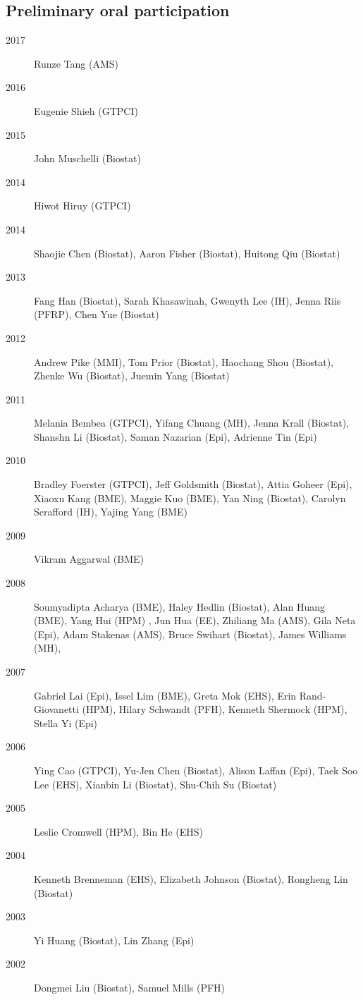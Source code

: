 \documentclass[12pt]{article}
\begin{document}
\subsection*{Preliminary oral participation}
\begin{description}
\item[\textnormal{2017}] Runze Tang (AMS)
\item[\textnormal{2016}] Eugenie Shieh (GTPCI)
\item[\textnormal{2015}] John Muschelli (Biostat)
\item[\textnormal{2014}] Hiwot Hiruy (GTPCI)
\item[\textnormal{2014}] Shaojie Chen (Biostat), Aaron Fisher (Biostat), Huitong Qiu (Biostat) 
\item[\textnormal{2013}] Fang Han (Biostat), Sarah Khasawinah, Gwenyth Lee (IH), Jenna Riis (PFRP), Chen Yue (Biostat)
\item[\textnormal{2012}] Andrew Pike (MMI), Tom Prior (Biostat), Haochang Shou (Biostat), Zhenke Wu (Biostat), Juemin Yang (Biostat)
\item[\textnormal{2011}] Melania Bembea (GTPCI), Yifang Chuang (MH), Jenna Krall (Biostat), Shanshn Li (Biostat), Saman Nazarian (Epi), Adrienne Tin (Epi)
\item[\textnormal{2010}] Bradley Foerster (GTPCI), Jeff Goldsmith (Biostat), Attia Goheer (Epi), Xiaoxu Kang (BME), Maggie Kuo (BME), Yan Ning (Biostat),  Carolyn Scrafford (IH), Yajing Yang (BME)
\item[\textnormal{2009}] Vikram Aggarwal (BME)
\item[\textnormal{2008}] Soumyadipta Acharya (BME), Haley Hedlin (Biostat), Alan Huang (BME), Yang Hui (HPM) , 
Jun Hua (EE),  Zhiliang Ma (AMS),  Gila Neta (Epi), Adam Stakenas (AMS), Bruce Swihart (Biostat), James Williams (MH),  
\item[\textnormal{2007}] Gabriel Lai (Epi), Issel Lim (BME), Greta Mok (EHS), Erin Rand-Giovanetti (HPM), Hilary Schwandt (PFH),  Kenneth Shermock (HPM), Stella Yi (Epi) 
\item[\textnormal{2006}] Ying Cao (GTPCI), Yu-Jen Chen (Biostat), Alison Laffan (Epi), Taek Soo Lee (EHS), Xianbin 
Li (Biostat), Shu-Chih Su (Biostat) 
\item[\textnormal{2005}] Leslie Cromwell (HPM), Bin He (EHS) 
\item[\textnormal{2004}] Kenneth Brenneman (EHS), Elizabeth Johnson (Biostat), Rongheng Lin (Biostat)
\item[\textnormal{2003}] Yi Huang (Biostat), Lin Zhang (Epi) 
\item[\textnormal{2002}] Dongmei Liu (Biostat), Samuel Mills (PFH)  
\end{description}
\end{document}
